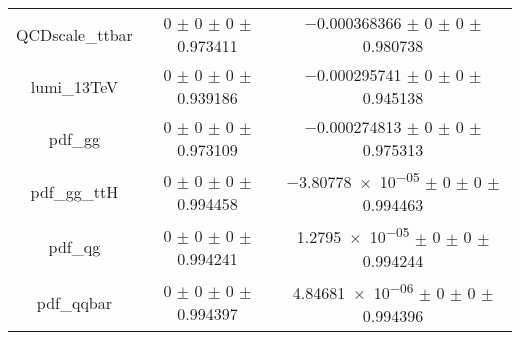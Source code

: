 \begin{table}
\begin{tabular}{ccc}
QCDscale\_ttbar & \num{0} $\pm$ \num{0} $\pm$ \num{0} $\pm$ \num{0.973411} & \num{-0.000368366} $\pm$ \num{0} $\pm$ \num{0} $\pm$ \num{0.980738}\\
lumi\_13TeV & \num{0} $\pm$ \num{0} $\pm$ \num{0} $\pm$ \num{0.939186} & \num{-0.000295741} $\pm$ \num{0} $\pm$ \num{0} $\pm$ \num{0.945138}\\
pdf\_gg & \num{0} $\pm$ \num{0} $\pm$ \num{0} $\pm$ \num{0.973109} & \num{-0.000274813} $\pm$ \num{0} $\pm$ \num{0} $\pm$ \num{0.975313}\\
pdf\_gg\_ttH & \num{0} $\pm$ \num{0} $\pm$ \num{0} $\pm$ \num{0.994458} & \num{-3.80778e-05} $\pm$ \num{0} $\pm$ \num{0} $\pm$ \num{0.994463}\\
pdf\_qg & \num{0} $\pm$ \num{0} $\pm$ \num{0} $\pm$ \num{0.994241} & \num{1.2795e-05} $\pm$ \num{0} $\pm$ \num{0} $\pm$ \num{0.994244}\\
pdf\_qqbar & \num{0} $\pm$ \num{0} $\pm$ \num{0} $\pm$ \num{0.994397} & \num{4.84681e-06} $\pm$ \num{0} $\pm$ \num{0} $\pm$ \num{0.994396}\\
\bottomrule
\end{tabular}
\end{table}